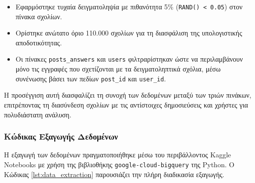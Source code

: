 \documentclass[a4paper,11pt,oneside,openany]{ioniothesis}
\begin{document}
\begin{itemize}
    \item Εφαρμόστηκε τυχαία δειγματοληψία με πιθανότητα 5\% (\texttt{RAND() < 0.05}) στον πίνακα σχολίων.
    \item Ορίστηκε ανώτατο όριο 110.000 σχολίων για τη διασφάλιση της υπολογιστικής αποδοτικότητας.
    \item Οι πίνακες \texttt{posts\_answers} και \texttt{users} φιλτραρίστηκαν ώστε να περιλαμβάνουν μόνο τις εγγραφές που σχετίζονται με τα δειγματοληπτικά σχόλια, μέσω συνένωσης βάσει των πεδίων \texttt{post\_id} και \texttt{user\_id}.
\end{itemize}

Η προσέγγιση αυτή διασφαλίζει τη συνοχή των δεδομένων μεταξύ των τριών πινάκων, επιτρέποντας τη διασύνδεση σχολίων με τις αντίστοιχες δημοσιεύσεις και χρήστες για πολυδιάστατη ανάλυση.

\subsubsection{Κώδικας Εξαγωγής Δεδομένων}

Η εξαγωγή των δεδομένων πραγματοποιήθηκε μέσω του περιβάλλοντος Kaggle Notebooks με χρήση της βιβλιοθήκης \texttt{google-cloud-bigquery} της Python. Ο Κώδικας \ref{lst:data_extraction} παρουσιάζει την πλήρη διαδικασία εξαγωγής.
\end{document}
